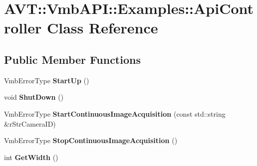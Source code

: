 \hypertarget{class_a_v_t_1_1_vmb_a_p_i_1_1_examples_1_1_api_controller}{}\section{A\+VT\+:\+:Vmb\+A\+PI\+:\+:Examples\+:\+:Api\+Controller Class Reference}
\label{class_a_v_t_1_1_vmb_a_p_i_1_1_examples_1_1_api_controller}
\subsection*{Public Member Functions}
\begin{DoxyCompactItemize}
\item 
\mbox{\label{class_a_v_t_1_1_vmb_a_p_i_1_1_examples_1_1_api_controller_aad4069cafe61c9e33ea80bd81478e1ae}} 
Vmb\+Error\+Type {\bfseries Start\+Up} ()
\item 
\mbox{\label{class_a_v_t_1_1_vmb_a_p_i_1_1_examples_1_1_api_controller_a3d95c82eb95e8ce5a654f6b0318098b2}} 
void {\bfseries Shut\+Down} ()
\item 
\mbox{\label{class_a_v_t_1_1_vmb_a_p_i_1_1_examples_1_1_api_controller_a6cf454b83d3766297dbe5176740fb1a5}} 
Vmb\+Error\+Type {\bfseries Start\+Continuous\+Image\+Acquisition} (const std\+::string \&r\+Str\+Camera\+ID)
\item 
\mbox{\label{class_a_v_t_1_1_vmb_a_p_i_1_1_examples_1_1_api_controller_a47495dfe8841f16664471fe26e669c45}} 
Vmb\+Error\+Type {\bfseries Stop\+Continuous\+Image\+Acquisition} ()
\item 
\mbox{\label{class_a_v_t_1_1_vmb_a_p_i_1_1_examples_1_1_api_controller_a0c44d06b42ef1b2608b0eb8be492e1d8}} 
int {\bfseries Get\+Width} ()
\item 
\mbox{\label{class_a_v_t_1_1_vmb_a_p_i_1_1_examples_1_1_api_controller_a295c3827a5eceb472818d4b005387cf1}} 

\end{DoxyCompactItemize}
